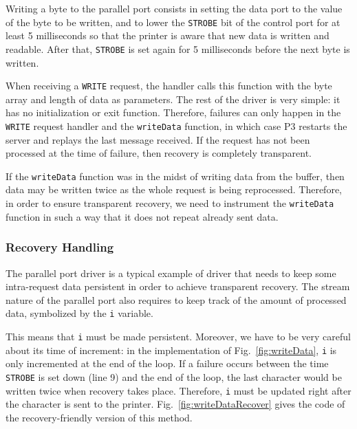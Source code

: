 \documentclass[times, 10pt, twocolumn]{article}
\begin{document}
Writing a byte to the parallel port consists in setting the data port to the value of the byte to be written, and to lower the \texttt{STROBE} bit of the control port for at least 5 milliseconds so that the printer is aware that new data is written and readable. After that, \texttt{STROBE} is set again for 5 milliseconds before the next byte is written.

When receiving a \texttt{WRITE} request, the handler calls this function with the byte array and length of data as parameters. The rest of the driver is very simple: it has no initialization or exit function. Therefore, failures can only happen in the \texttt{WRITE} request handler and the \texttt{writeData} function, in which case P3 restarts the server and replays the last message received. If the request has not been processed at the time of failure, then recovery is completely transparent.

If the \texttt{writeData} function was in the midst of writing data from the buffer, then data may be written twice as the whole request is being reprocessed. Therefore, in order to ensure transparent recovery, we need to instrument the \texttt{writeData} function in such a way that it does not repeat already sent data.

\subsubsection{Recovery Handling}
The parallel port driver is a typical example of driver that needs to keep some intra-request data persistent in order to achieve transparent recovery. The stream nature of the parallel port also requires to keep track of the amount of processed data, symbolized by the \texttt{i} variable.

This means that \texttt{i} must be made persistent. Moreover, we have to be very careful about its time of increment: in the implementation of Fig.~\ref{fig:writeData}, \texttt{i} is only incremented at the end of the loop. If a failure occurs between the time \texttt{STROBE} is set down (line 9) and the end of the loop, the last character would be written twice when recovery takes place. Therefore, \texttt{i} must be updated right after the character is sent to the printer. Fig.~\ref{fig:writeDataRecover} gives the code of the recovery-friendly version of this method.
\end{document}
